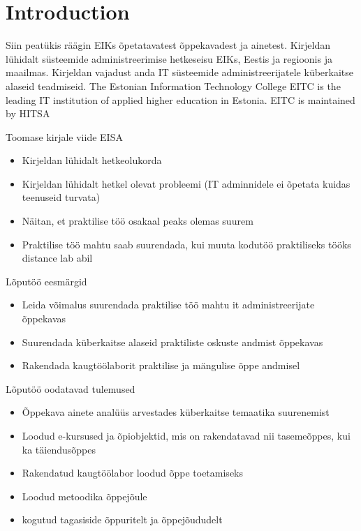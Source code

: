 \chapter{Introduction}
\label{Introduction}


Siin peatükis räägin EIKs õpetatavatest õppekavadest ja ainetest. Kirjeldan lühidalt süsteemide administreerimise hetkeseisu EIKs, Eestis ja regioonis ja maailmas. Kirjeldan vajadust anda IT süsteemide administreerijatele küberkaitse alaseid teadmiseid.
The Estonian Information Technology College \gls{EITC} is the leading IT institution of applied higher education in Estonia. \cite{EITC} \gls{EITC} is maintained by \gls{HITSA}

Toomase kirjale viide \gls{EISA}
\begin{itemize}
	\item Kirjeldan lühidalt hetkeolukorda
	\item Kirjeldan lühidalt hetkel olevat probleemi (IT adminnidele ei õpetata kuidas teenuseid turvata)
	\item Näitan, et praktilise töö osakaal peaks olemas suurem
	\item Praktilise töö mahtu saab suurendada, kui muuta kodutöö praktiliseks tööks distance lab abil
	
\end{itemize}

Lõputöö eesmärgid
\begin{itemize}
	\item Leida võimalus suurendada praktilise töö mahtu it administreerijate õppekavas
	\item Suurendada küberkaitse alaseid praktiliste oskuste andmist õppekavas
	\item Rakendada kaugtöölaborit praktilise ja mängulise õppe andmisel
\end{itemize}


Lõputöö oodatavad tulemused
\begin{itemize}
	\item Õppekava ainete analüüs arvestades küberkaitse temaatika suurenemist
	\item Loodud e-kursused ja õpiobjektid, mis on rakendatavad nii tasemeõppes, kui ka täiendusõppes
	\item Rakendatud kaugtöölabor loodud õppe toetamiseks
	\item Loodud metoodika õppejõule
	\item kogutud tagasiside õppuritelt ja õppejõududelt
\end{itemize}